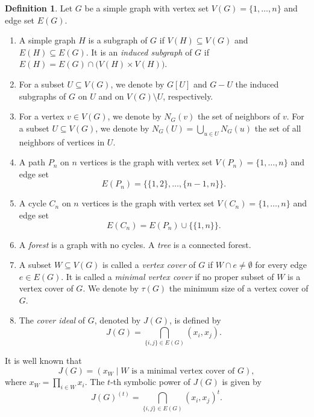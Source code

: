 \documentclass[12pt,amscd]{amsart}
\theoremstyle{definition}
\newtheorem{defn}[thm]{Definition}
\numberwithin{equation}{section}
\begin{document}
\begin{defn}\label{definition1}
Let \( G \) be a simple graph with vertex set \( V(G) = \{1, \ldots, n\} \) and edge set \( E(G) \).

\begin{enumerate}
    \item A simple graph \( H \) is a subgraph of \( G \) if \( V(H) \subseteq V(G) \) and \( E(H) \subseteq E(G) \). It is an \emph{induced subgraph} of \( G \) if \( E(H) = E(G) \cap \big( V(H) \times V(H) \big) \).
    
    \item For a subset \( U \subseteq V(G) \), we denote by \( G[U] \) and \( G - U \) the induced subgraphs of \( G \) on \( U \) and on \( V(G) \setminus U \), respectively.
    
    \item For a vertex $v \in V(G)$, we denote by $N_G(v)$ the set of neighbors of $v$. For a subset $U \subseteq V(G)$, we denote by $N_G(U) = \bigcup_{u \in U} N_G(u)$ the set of all neighbors of vertices in $U$.
    
    \item A path \( P_n \) on \( n \) vertices is the graph with vertex set \( V(P_n) = \{1, \ldots, n\} \) and edge set
    \[
    E(P_n) = \{ \{1,2\}, \ldots, \{n-1,n\} \}.
    \]
    
    \item A cycle \( C_n \) on \( n \) vertices is the graph with vertex set \( V(C_n) = \{1, \ldots, n\} \) and edge set
    \[
    E(C_n) = E(P_n) \cup \{ \{1,n\} \}.
    \]
    
    \item A \emph{forest} is a graph with no cycles. A \emph{tree} is a connected forest.
    
    
   \item    A subset $W \subseteq V(G)$ is called a \emph{vertex cover} of $G$ if $W \cap e \neq \emptyset$ for every edge $e \in E(G)$. It is called a \emph{minimal vertex cover} if no proper subset of $W$ is a vertex cover of $G$. We denote by $\tau(G)$ the minimum size of a vertex cover of $G$.
   
   \item The \emph{cover ideal} of $G$, denoted by $J(G)$, is defined by
$$J(G) = \bigcap_{\{i,j\} \in E(G)} (x_i,x_j).$$

\end{enumerate}
\end{defn}


It is well known that
$$J(G) = (x_W \mid W \text{ is a minimal vertex cover of } G),$$
where $x_W = \prod_{i \in W} x_i$. The $t$-th symbolic power of $J(G)$ is given by
$$J(G)^{(t)}=\bigcap_{ \{i,j\} \in E(G)}(x_i, x_j)^t.$$
\end{document}
